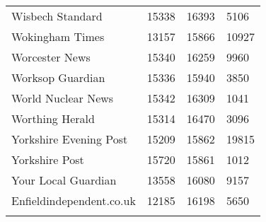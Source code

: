 \begin{longtable}{p{}p{}p{}p{}}
  Wisbech Standard & 15338 & 16393 & 5106 \\ 
  Wokingham Times & 13157 & 15866 & 10927 \\ 
  Worcester News & 15340 & 16259 & 9960 \\ 
  Worksop Guardian & 15336 & 15940 & 3850 \\ 
  World Nuclear News & 15342 & 16309 & 1041 \\ 
  Worthing Herald & 15314 & 16470 & 3096 \\ 
  Yorkshire Evening Post & 15209 & 15862 & 19815 \\ 
  Yorkshire Post & 15720 & 15861 & 1012 \\ 
  Your Local Guardian & 13558 & 16080 & 9157 \\ 
  Enfieldindependent.co.uk & 12185 & 16198 & 5650 \\ 
   \hline
\hline
\label{tab:summary}
\end{longtable}
\endgroup
